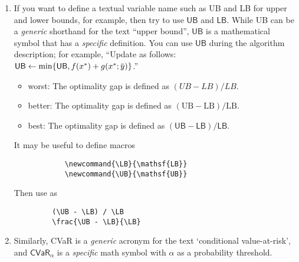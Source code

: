 \documentclass[letterpaper, 11pt]{article}
\newcommand{\LB}{\mathsf{LB}}
\newcommand{\UB}{\mathsf{UB}}
\renewcommand{\bar}[1]{\mkern 1.5mu\overline{\mkern-1.5mu#1\mkern-1.5mu}\mkern 1.5mu}
\begin{document}
\begin{enumerate}
\begin{enumerate}
	\item If you want to define a textual variable name such as UB and LB for upper and lower bounds, for example, then try to use $\mathsf{UB}$ and $\mathsf{LB}$. While UB can be a \emph{generic} shorthand for the text ``upper bound'', $\mathsf{UB}$ is a mathematical symbol that has a \emph{specific} definition. You can use $\mathsf{UB}$ during the algorithm description; for example, ``Update as follows: $\mathsf{UB} \gets \min\{\mathsf{UB}, f(x^*) + g(x^*; \bar{y})\}$.''
		\begin{itemize}
		\item worst: The optimality gap is defined as $(UB - LB)/LB$.
		\item better: The optimality gap is defined as $(\text{UB} - \text{LB})/\text{LB}$.
		\item best: The optimality gap is defined as $(\mathsf{UB} - \mathsf{LB})/\mathsf{LB}$.
		\end{itemize}
		It may be useful to define macros
			\begin{verbatim}
			\newcommand{\LB}{\mathsf{LB}}
			\newcommand{\UB}{\mathsf{UB}}			
			\end{verbatim}
		 Then use as
		 \begin{verbatim}
		 (\UB - \LB) / \LB	
		 \frac{\UB - \LB}{\LB}
		 \end{verbatim}
		\item Similarly, CVaR is a \emph{generic} acronym for the text `conditional value-at-risk', and $\mathsf{CVaR}_\alpha$ is a \emph{specific} math symbol with $\alpha$ as a probability threshold.	 
	\end{enumerate}
\end{enumerate}
\end{document}
